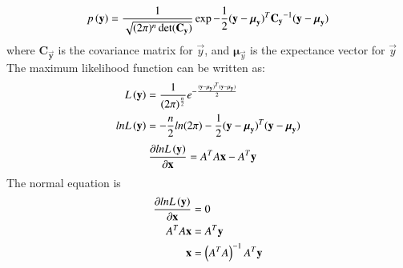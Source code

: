 \documentclass[journal,12pt,onecolumn]{IEEEtran}
\providecommand{\mtx}[1]{\mathbf{#1}}
\theoremstyle{remark}
\begin{document}
\begin{align}
p\left(\mathbf{y}\right)= \frac{1}{\sqrt{ (2\pi)^n \det( \mathbf{C_{\mathbf{y}}})}} \exp {-\dfrac12 ({\mathbf{y}-{\boldsymbol{\mu}}}_{\mathbf{y}})^T{ \mathbf{C_{\mathbf{y}}}}^{-1}{({\mathbf{y}-{\boldsymbol{\mu}}_{\mathbf{y}}})}}
\end{align}
where $ \mathbf{C_{\vec{y}}} $ is the covariance matrix for $\vec{y}$, and $\boldsymbol{\mu}_{\vec{y}}$ is the expectance vector for $\vec{y}$
The maximum likelihood function can be written as:
\begin{align}
L\left(\mathbf{y}\right)&=\frac{1}{{(2\pi)}^{\frac{n}{2}}}e^{-\frac{({\mathbf{y}-{\boldsymbol{\mu}}}_{\mathbf{y}})^T{({\mathbf{y}-{\boldsymbol{\mu}}_{\mathbf{y}}})}}{2}}\\
ln L\left(\mathbf{y}\right)&=-\frac{n}{2}ln(2\pi)-\dfrac12 ({\mathbf{y}-{\boldsymbol{\mu}}}_{\mathbf{y}})^T{({\mathbf{y}-{\boldsymbol{\mu}}_{\mathbf{y}}})}
\end{align}
\begin{align}
\frac{\partial ln L\left(\mathbf{y}\right)}{\partial \mathbf{x}}&={A}^TA\mathbf{x}-{A}^T\mathbf{y}
\end{align}
The normal equation is
\begin{align}
\frac{\partial ln L\left(\mathbf{y}\right)}{\partial \mathbf{x}}&=0\\
{A}^TA\mathbf{x}&={A}^T\mathbf{y}\\
\mathbf{x}&=\left({A}^TA\right)^{-1}{A}^T\mathbf{y}
\end{align}
\end{document}
